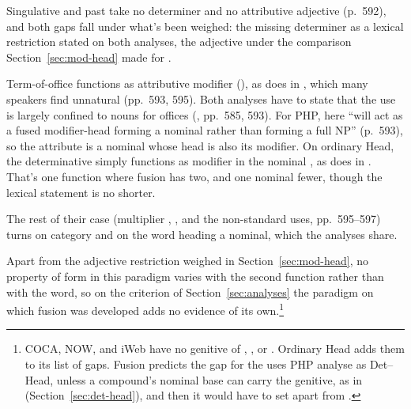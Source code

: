 Singulative and past  take no determiner and no attributive adjective (p.~592), and both gaps fall under what's been weighed: the missing determiner as a lexical restriction stated on both analyses, the adjective under the comparison Section~\ref{sec:mod-head} made for .

Term-of-office  functions as attributive modifier (), as does  in , which many speakers find unnatural (pp.~593, 595). Both analyses have to state that the use is largely confined to nouns for offices (, pp.~585, 593). For PHP,  here \enquote{will act as a fused modifier-head forming a nominal rather than forming a full NP} (p.~593), so the attribute is a nominal whose head is also its modifier. On ordinary Head, the determinative  simply functions as modifier in the nominal , as  does in . That's one function where fusion has two, and one nominal fewer, though the lexical statement is no shorter.

The rest of their case (multiplier , , and the non-standard uses, pp.~595--597) turns on category and on the word heading a nominal, which the analyses share.

Apart from the adjective restriction weighed in Section~\ref{sec:mod-head}, no property of form in this paradigm varies with the second function rather than with the word, so on the criterion of Section~\ref{sec:analyses} the paradigm on which fusion was developed adds no evidence of its own.\footnote{COCA, NOW, and iWeb have no genitive of , , or . Ordinary Head adds them to its list of gaps. Fusion predicts the gap for the uses PHP analyse as Det--Head, unless a compound's nominal base can carry the genitive, as in  (Section~\ref{sec:det-head}), and then it would have to set  apart from .}
